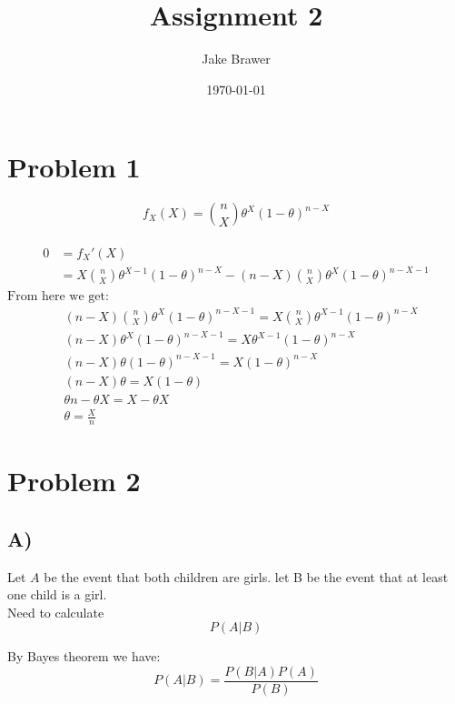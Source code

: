 \documentclass[11pt]{article}
\author{Jake Brawer}
\date{\today}
\title{Assignment 2}
\begin{document}
\maketitle

\section*{Problem 1}
\label{sec:org4d6bbb3}
\begin{equation}
f_{X}(X) = {{n}\choose{X}}\theta^{X}(1-\theta)^{n-X}
\end{equation}
\\

\begin{align}
  0 &= f_{X}'(X)\\
    &=  X{{n}\choose{X}}\theta^{X - 1}(1-\theta)^{n-X} - (n-X){{n}\choose{X}}\theta^{X}(1- \theta)^{n-X-1}
\end{align}
$\text{From here we get:}$
\begin{align}
    &(n-X){{n}\choose{X}}\theta^{X}(1- \theta)^{n-X-1} = X{{n}\choose{X}}\theta^{X - 1}(1-\theta)^{n-X}\\
  &(n-X)\theta^{X}(1-\theta)^{n-X-1} = X\theta^{X-1}(1-\theta)^{n-X}\\
  &(n-X)\theta(1-\theta)^{n-X-1} = X(1-\theta)^{n-X}\\
  &(n-X)\theta= X(1-\theta)\\
  &\theta n - \theta X = X - \theta X\\
  &\theta = \frac{X}{n}
\end{align}

\section*{Problem 2}
\label{sec:orgef92308}

\subsection*{A)}
\label{sec:org22cd0b1}
Let \(A\) be the event that both children are girls. let B be the event that at least one child is a girl.\\
Need to calculate $$P(A|B)$$

By Bayes theorem we have:
\begin{equation}
  P(A|B) = \frac{P(B|A)P(A)}{P(B)}
\end{equation}
\end{document}
